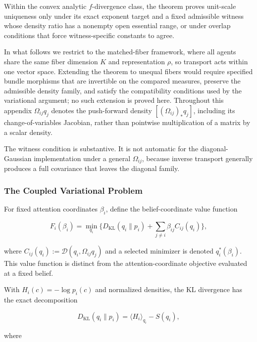 \documentclass[twoside,11pt]{article}
\begin{document}
Within the convex analytic $f$-divergence class, the theorem proves unit-scale uniqueness only under its exact exponent target and a fixed admissible witness whose density ratio has a nonempty open essential range, or under overlap conditions that force witness-specific constants to agree.

In what follows we restrict to the matched-fiber framework, where all agents share the same fiber dimension $K$ and representation $\rho$, so transport acts within one vector space. Extending the theorem to unequal fibers would require specified bundle morphisms that are invertible on the compared measures, preserve the admissible density family, and satisfy the compatibility conditions used by the variational argument; no such extension is proved here. Throughout this appendix $\Omega_{ij}q_j$ denotes the push-forward density $[(\Omega_{ij})_*q_j]$, including its change-of-variables Jacobian, rather than pointwise multiplication of a matrix by a scalar density.

The witness condition is substantive. It is not automatic for the diagonal-Gaussian implementation under a general $\Omega_{ij}$, because inverse transport generally produces a full covariance that leaves the diagonal family.

\subsubsection{The Coupled Variational Problem}

For fixed attention coordinates $\beta_i$, define the belief-coordinate value function

\begin{equation}
F_i(\beta_i)
=\min_{q_i}
\Big\{
D_{\mathrm{KL}}(q_i \| p_i)
+ \sum_{j\neq i} \beta_{ij} C_{ij}(q_i)
\Big\},
\label{eq:F_i_supp}
\end{equation}

where $C_{ij}(q_i):=\mathcal{D}(q_i,\Omega_{ij}q_j)$ and a selected minimizer is denoted $q_i^*(\beta_i)$. This value function is distinct from the attention-coordinate objective evaluated at a fixed belief.

With $H_i(c)=-\log p_i(c)$ and normalized densities, the KL divergence has the exact decomposition

\begin{equation}
D_{\mathrm{KL}}(q_i \| p_i) = \langle H_i \rangle_{q_i} - S(q_i),
\end{equation}

where
\end{document}
